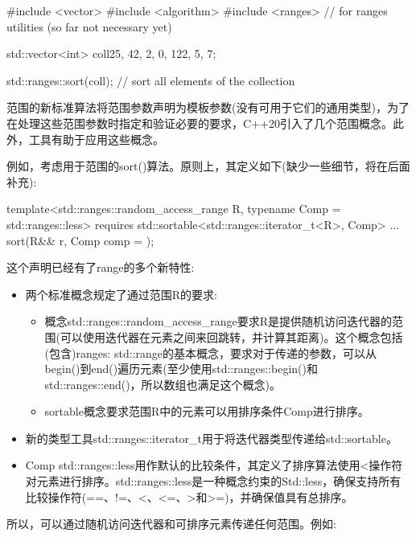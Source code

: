\begin{cpp}
#include <vector>
#include <algorithm>
#include <ranges> // for ranges utilities (so far not necessary yet)

std::vector<int> coll{25, 42, 2, 0, 122, 5, 7};

std::ranges::sort(coll); // sort all elements of the collection
\end{cpp}


范围的新标准算法将范围参数声明为模板参数(没有可用于它们的通用类型)，为了在处理这些范围参数时指定和验证必要的要求，C++20引入了几个范围概念。此外，工具有助于应用这些概念。

例如，考虑用于范围的sort()算法。原则上，其定义如下(缺少一些细节，将在后面补充):

\begin{cpp}
template<std::ranges::random_access_range R,
		typename Comp = std::ranges::less>
requires std::sortable<std::ranges::iterator_t<R>, Comp>
... sort(R&& r, Comp comp = {});
\end{cpp}

这个声明已经有了range的多个新特性:

\begin{itemize}
\item
两个标准概念规定了通过范围R的要求:

\begin{itemize}
\item
概念std::ranges::random\_access\_range要求R是提供随机访问迭代器的范围(可以使用迭代器在元素之间来回跳转，并计算其距离)。这个概念包括(包含)ranges: std::range的基本概念，要求对于传递的参数，可以从begin()到end()遍历元素(至少使用std::ranges::begin()和std::ranges::end()，所以数组也满足这个概念)。

\item
sortable概念要求范围R中的元素可以用排序条件Comp进行排序。
\end{itemize}

\item
新的类型工具std::ranges::iterator\_t用于将迭代器类型传递给std::sortable。

\item
Comp std::ranges::less用作默认的比较条件，其定义了排序算法使用<操作符对元素进行排序。std::ranges::less是一种概念约束的Std::less，确保支持所有比较操作符(==、!=、<、<=、>和>=)，并确保值具有总排序。
\end{itemize}

所以，可以通过随机访问迭代器和可排序元素传递任何范围。例如:

